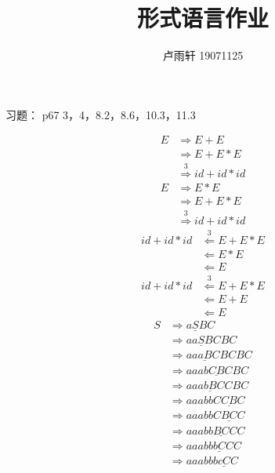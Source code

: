 \documentclass[a4paper, twocolumn]{ctexart}
\title{形式语言作业}
\author{卢雨轩 19071125}
\newcommand{\tto}{\Rightarrow}
\begin{document}
\abovedisplayskip=-15pt
\abovedisplayshortskip=0pt
\belowdisplayskip=20pt

\maketitle

习题： p67 3，4，8.2，8.6，10.3，11.3

\begin{outline}[enumerate]

    \1[3.]
    \begin{align*}
        E & \tto E + E \\
        & \tto E + E * E \\
        & \overset{3} \tto id + id * id
    \end{align*}
    \begin{align*}
        E & \tto E * E \\
        & \tto E + E * E \\
        & \overset{3} \tto id + id * id
    \end{align*}
    \begin{align*}
        id + id * id  & \overset{3}\Leftarrow E + E * E \\
        & \Leftarrow E * E \\
        & \Leftarrow E
    \end{align*}
    \begin{align*}
        id + id * id  & \overset{3}\Leftarrow E + E * E \\
        & \Leftarrow E + E \\
        & \Leftarrow E
    \end{align*}
    \1 [4.] \begin{align*}
        S & \tto a\underline{S}BC \\
          & \tto aa\underline{S}BCBC \\
          & \tto aa\underline{aB}CBCBC \\
          & \tto aaab\underline{CB}CBC \\
          & \tto aaa\underline{bB}CCBC \\
          & \tto aaabbC\underline{CB}C \\
          & \tto aaabbC\underline{BC}C \\
          & \tto aaabb\underline{BC}CC \\
          & \tto aaabb\underline{bC}CC \\
          & \tto aaabbb\underline{cC}C \\

\end{align*}
\end{outline}
\end{document}
